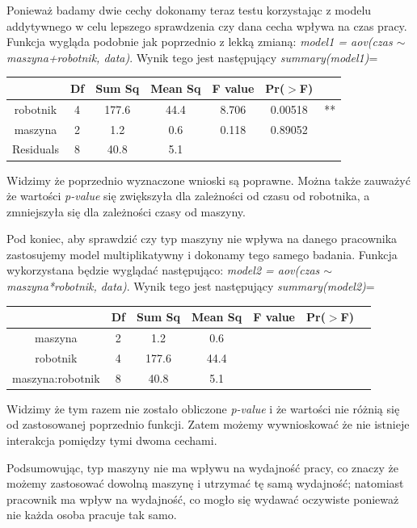 \documentclass{article}
\begin{document}
Ponieważ badamy dwie cechy dokonamy teraz testu korzystając z modelu addytywnego w celu lepszego sprawdzenia czy dana cecha wpływa na czas pracy. Funkcja wygląda podobnie jak poprzednio z lekką zmianą: \textit{model1 = aov(czas $\sim$ maszyna+robotnik, data)}. Wynik tego jest następujący \textit{summary(model1)}=
\begin{center} \begin{tabular}{|c|c|c|c|c|c|c|} \hline
& Df & Sum Sq & Mean Sq & F value & Pr($>$F) & \\ \hline
robotnik & 4 & 177.6 & 44.4 & 8.706 & 0.00518 & ** \\ \hline
maszyna & 2 & 1.2 & 0.6 & 0.118 & 0.89052 & \\ \hline
Residuals & 8 & 40.8 & 5.1 & & & \\ \hline
\end{tabular} \end{center}
Widzimy że poprzednio wyznaczone wnioski są poprawne. Można także zauważyć że wartości \textit{p-value} się zwiększyła dla zależności od czasu od robotnika, a zmniejszyła się dla zależności czasy od maszyny. \\ \par

Pod koniec, aby sprawdzić czy typ maszyny nie wpływa na danego pracownika zastosujemy model multiplikatywny i dokonamy tego samego badania. Funkcja wykorzystana będzie wyglądać następująco: \textit{model2 = aov(czas $\sim$ maszyna*robotnik, data)}. Wynik tego jest następujący \textit{summary(model2)}=
\begin{center} \begin{tabular}{|c|c|c|c|c|c|c|} \hline
& Df & Sum Sq & Mean Sq & F value & Pr($>$F) & \\ \hline
maszyna & 2 & 1.2 & 0.6 & & & \\ \hline
robotnik & 4 & 177.6 & 44.4 & & & \\ \hline
maszyna:robotnik & 8 & 40.8 & 5.1 & & & \\ \hline
\end{tabular} \end{center}
Widzimy że tym razem nie zostało obliczone \textit{p-value} i że wartości nie różnią się od zastosowanej poprzednio funkcji. Zatem możemy wywnioskować że nie istnieje interakcja pomiędzy tymi dwoma cechami. \\ \par
Podsumowując, typ maszyny nie ma wpływu na wydajność pracy, co znaczy że możemy zastosować dowolną maszynę i utrzymać tę samą wydajność; natomiast pracownik ma wpływ na wydajność, co mogło się wydawać oczywiste ponieważ nie każda osoba pracuje tak samo.
\end{document}
